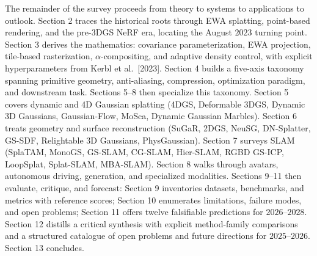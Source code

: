 \documentclass{article}
\begin{document}
The remainder of the survey proceeds from theory to systems to applications to outlook. Section 2 traces the historical roots through EWA splatting, point-based rendering, and the pre-3DGS NeRF era, locating the August \(2023\) turning point. Section 3 derives the mathematics: covariance parameterization, EWA projection, tile-based rasterization, \(\alpha\)-compositing, and adaptive density control, with explicit hyperparameters from Kerbl et al.~{[}2023{]}. Section 4 builds a five-axis taxonomy spanning primitive geometry, anti-aliasing, compression, optimization paradigm, and downstream task. Sections 5--8 then specialize this taxonomy. Section 5 covers dynamic and 4D Gaussian splatting (4DGS, Deformable 3DGS, Dynamic 3D Gaussians, Gaussian-Flow, MoSca, Dynamic Gaussian Marbles). Section 6 treats geometry and surface reconstruction (SuGaR, 2DGS, NeuSG, DN-Splatter, GS-SDF, Relightable 3D Gaussians, PhysGaussian). Section 7 surveys SLAM (SplaTAM, MonoGS, GS-SLAM, CG-SLAM, Hier-SLAM, RGBD GS-ICP, LoopSplat, Splat-SLAM, MBA-SLAM). Section 8 walks through avatars, autonomous driving, generation, and specialized modalities. Sections 9--11 then evaluate, critique, and forecast: Section 9 inventories datasets, benchmarks, and metrics with reference scores; Section 10 enumerates limitations, failure modes, and open problems; Section 11 offers twelve falsifiable predictions for \(2026\)--\(2028\). Section 12 distills a critical synthesis with explicit method-family comparisons and a structured catalogue of open problems and future directions for \(2025\)--\(2026\). Section 13 concludes.
\end{document}

